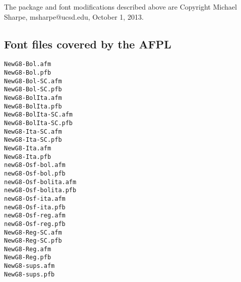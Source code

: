\documentclass[11pt]{article}
\begin{document}
The package and font modifications described above are Copyright Michael Sharpe, msharpe@ucsd.edu, October 1, 2013.

\subsection{Font files covered by the AFPL}
\begin{verbatim}
NewG8-Bol.afm
NewG8-Bol.pfb
NewG8-Bol-SC.afm
NewG8-Bol-SC.pfb
NewG8-BolIta.afm
NewG8-BolIta.pfb
NewG8-BolIta-SC.afm
NewG8-BolIta-SC.pfb
NewG8-Ita-SC.afm
NewG8-Ita-SC.pfb
NewG8-Ita.afm
NewG8-Ita.pfb
newG8-Osf-bol.afm
newG8-Osf-bol.pfb
newG8-Osf-bolita.afm
newG8-Osf-bolita.pfb
newG8-Osf-ita.afm
newG8-Osf-ita.pfb
newG8-Osf-reg.afm
newG8-Osf-reg.pfb
NewG8-Reg-SC.afm
NewG8-Reg-SC.pfb
NewG8-Reg.afm
NewG8-Reg.pfb
NewG8-sups.afm
NewG8-sups.pfb
\end{verbatim}
\end{document}
